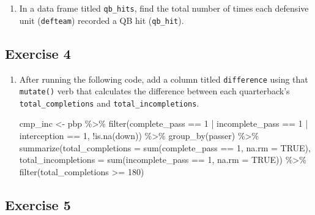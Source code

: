 \documentclass[
  letterpaper,
]{krantz}
\newenvironment{Shaded}{\begin{snugshade}}{\end{snugshade}}
\newcommand{\AttributeTok}[1]{\textcolor[rgb]{0.40,0.45,0.13}{#1}}
\newcommand{\ConstantTok}[1]{\textcolor[rgb]{0.56,0.35,0.01}{#1}}
\newcommand{\DecValTok}[1]{\textcolor[rgb]{0.68,0.00,0.00}{#1}}
\newcommand{\FunctionTok}[1]{\textcolor[rgb]{0.28,0.35,0.67}{#1}}
\newcommand{\NormalTok}[1]{\textcolor[rgb]{0.00,0.23,0.31}{#1}}
\newcommand{\OtherTok}[1]{\textcolor[rgb]{0.00,0.23,0.31}{#1}}
\newcommand{\SpecialCharTok}[1]{\textcolor[rgb]{0.37,0.37,0.37}{#1}}
\providecommand{\tightlist}{%
  \setlength{\itemsep}{0pt}\setlength{\parskip}{0pt}}\usepackage{longtable,booktabs,array}
\begin{document}
\begin{enumerate}
\def\labelenumi{\arabic{enumi}.}
\tightlist
\item
  In a data frame titled \texttt{qb\_hits}, find the total number of
  times each defensive unit (\texttt{defteam}) recorded a QB hit
  (\texttt{qb\_hit}).
\end{enumerate}

\hypertarget{exercise-4}{%
\subsection{\texorpdfstring{\textbf{Exercise
4}}{Exercise 4}}\label{exercise-4}}

\begin{enumerate}
\def\labelenumi{\arabic{enumi}.}
\item
  After running the following code, add a column titled
  \texttt{difference} using that \texttt{mutate()} verb that calculates
  the difference between each quarterback's \texttt{total\_completions}
  and \texttt{total\_incompletions}.

\begin{Shaded}
\begin{Highlighting}[]
\NormalTok{cmp\_inc }\OtherTok{\textless{}{-}}\NormalTok{ pbp }\SpecialCharTok{\%\textgreater{}\%}
  \FunctionTok{filter}\NormalTok{(complete\_pass }\SpecialCharTok{==} \DecValTok{1} \SpecialCharTok{|}
\NormalTok{           incomplete\_pass }\SpecialCharTok{==} \DecValTok{1} \SpecialCharTok{|}
\NormalTok{           interception }\SpecialCharTok{==} \DecValTok{1}\NormalTok{, }\SpecialCharTok{!}\FunctionTok{is.na}\NormalTok{(down)) }\SpecialCharTok{\%\textgreater{}\%}
  \FunctionTok{group\_by}\NormalTok{(passer) }\SpecialCharTok{\%\textgreater{}\%}
  \FunctionTok{summarize}\NormalTok{(}\AttributeTok{total\_completions =} \FunctionTok{sum}\NormalTok{(complete\_pass }\SpecialCharTok{==} \DecValTok{1}\NormalTok{, }\AttributeTok{na.rm =} \ConstantTok{TRUE}\NormalTok{),}
            \AttributeTok{total\_incompletions =} \FunctionTok{sum}\NormalTok{(incomplete\_pass }\SpecialCharTok{==} \DecValTok{1}\NormalTok{, }\AttributeTok{na.rm =} \ConstantTok{TRUE}\NormalTok{)) }\SpecialCharTok{\%\textgreater{}\%}
  \FunctionTok{filter}\NormalTok{(total\_completions }\SpecialCharTok{\textgreater{}=} \DecValTok{180}\NormalTok{)}
\end{Highlighting}
\end{Shaded}
\end{enumerate}

\hypertarget{exercise-5}{%
\subsection{\texorpdfstring{\textbf{Exercise
5}}{Exercise 5}}\label{exercise-5}}
\end{document}
